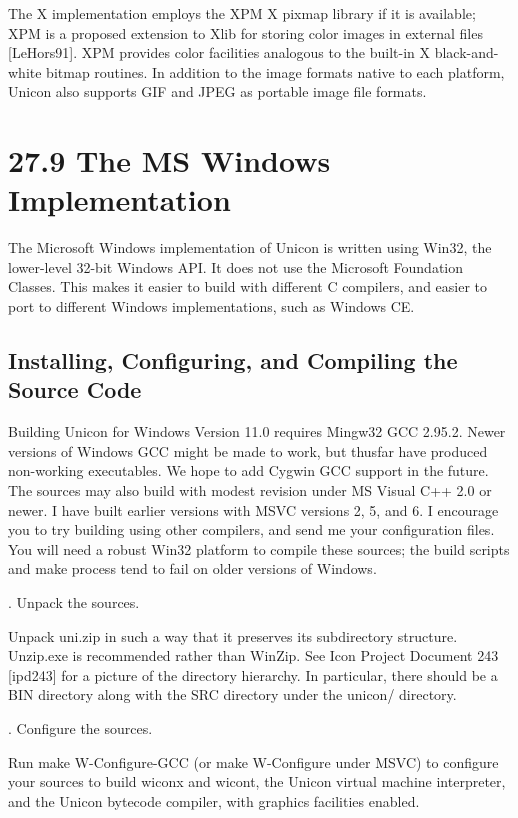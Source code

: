 The X implementation employs the XPM X pixmap library if it is
available; XPM is a proposed extension to Xlib for storing color
images in external files [LeHors91]. XPM provides color facilities
analogous to the built-in X black-and-white bitmap routines. In
addition to the image formats native to each platform, Unicon also
supports GIF and JPEG as portable image file formats.

\section[27.9 The MS Windows Implementation]{27.9 The MS Windows Implementation}

The Microsoft Windows implementation of Unicon is written using Win32,
the lower-level 32-bit Windows API. It does not use the Microsoft
Foundation Classes. This makes it easier to build with different C
compilers, and easier to port to different Windows implementations,
such as Windows CE.

\subsection{Installing, Configuring, and Compiling the Source Code}

Building Unicon for Windows Version 11.0 requires Mingw32 GCC
2.95.2. Newer versions of Windows GCC might be made to work, but
thusfar have produced non-working executables. We hope to add Cygwin
GCC support in the future. The sources may also build with modest
revision under MS Visual C++ 2.0 or newer. I have built earlier
versions with MSVC versions 2, 5, and 6. I encourage you to try
building using other compilers, and send me your configuration
files. You will need a robust Win32 platform to compile these sources;
the build scripts and {\textquotedbl}make{\textquotedbl} process tend
to fail on older versions of Windows.

{. Unpack the sources.}

Unpack uni.zip in such a way that it preserves its subdirectory
structure. Unzip.exe is recommended rather than WinZip.  See Icon
Project Document 243 [ipd243] for a picture of the directory
hierarchy. In particular, there should be a BIN directory along with
the SRC directory under the unicon/ directory.

{. Configure the sources.}


Run {\textquotedbl}make W-Configure-GCC{\textquotedbl} (or
{\textquotedbl}make W-Configure{\textquotedbl} under MSVC) to
configure your sources to build wiconx and wicont, the Unicon virtual
machine interpreter, and the Unicon bytecode compiler, with graphics
facilities enabled.


